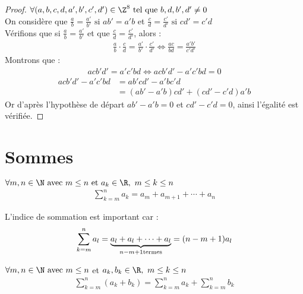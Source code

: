 \begin{proof}
	$\forall (a, b, c, d, a', b', c', d') \in \Z^8 \text{ tel que } b, d, b', d' \neq 0$ \\
	On considère que 
	$\frac{a}{b} = \frac{a'}{b'} \text{ si } ab' = a'b$
	et 
	$\frac{c}{d} = \frac{c'}{d'} \text{ si } cd' = c'd$
	\\
	Vérifions que si $\frac{a}{b} = \frac{a'}{b'}$ et que $\frac{c}{d} = \frac{c'}{d'}$, alors :
	\begin{align*}
		\frac{a}{b} \cdot \frac{c}{d} = \frac{a'}{b'} \cdot \frac{c'}{d'} \iff \frac{ac}{bd} = \frac{a'b'}{c'd'}
	\end{align*}
	Montrons que :
	\begin{align*}
		ac b'd' = a'c' bd \iff ac b' d' - a'c' bd = 0
	\end{align*}
	\begin{align*}
		acb'd' - a'c'bd &= ab' cd' - a'b c'd \\
		&= (ab' - a'b)cd' + (cd' - c'd)a'b 
	\end{align*}
	Or d'après l'hypothèse de départ $ab' - a'b = 0$ et $cd' - c'd = 0$, ainsi l'égalité est vérifiée.
\end{proof}
\section{Sommes}

\begin{graybox}
	\begin{definition}
		$\forall m, n \in \N \textnormal{ avec } m \leq n \textnormal{ et } a_k \in \R, \ m \leq k \leq n$
		\begin{align*}
			\sum_{k = m}^{n}a_k = a_m + a_{m+1} + \cdots + a_n	
		\end{align*}
	\end{definition}
\end{graybox}

\begin{remarque}
	L'indice de sommation est important car :
	\begin{align*}
		\sum_{k = m}^{n}a_l = \underbrace{a_l + a_l + \cdots + a_l}_{n - m + 1 \textnormal{termes}} = (n - m + 1)a_l
	\end{align*}
\end{remarque}

\begin{graybox}
	\begin{proposition}
		$\forall m, n \in \N \text{ avec } m \leq n$ et $a_k, b_k \in \R, \ m \leq k \leq n$
		\begin{align*}
			\sum_{k = m}^{n} (a_k + b_k) = \sum_{k=m}^{n}a_k + \sum_{k=m}^{n}b_k	
		\end{align*}
	\end{proposition}
\end{graybox}

